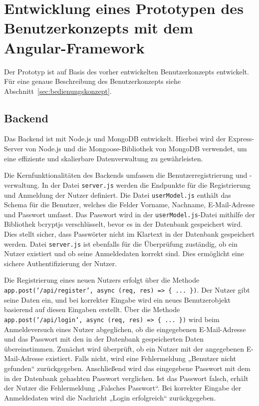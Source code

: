 \chapter{Entwicklung eines Prototypen des Benutzerkonzepts mit dem Angular-Framework}
\label{chap:prototyp}
Der Prototyp ist auf Basis des vorher entwickelten Benutzerkonzepts entwickelt. Für eine genaue Beschreibung des Benutzerkonzepts siehe Abschnitt~\ref{sec:bedienungskonzept}.

\section{Backend}
Das Backend ist mit Node.js und MongoDB entwickelt. 
Hierbei wird der Express-Server von Node.js und die Mongoose-Bibliothek von MongoDB verwendet, um eine effiziente und skalierbare Datenverwaltung zu gewährleisten.

Die Kernfunktionalitäten des Backends umfassen die Benutzerregistrierung und -verwaltung. 
In der Datei \texttt{server.js} werden die Endpunkte für die Registrierung und Anmeldung der Nutzer definiert. 
Die Datei \texttt{userModel.js} enthält das Schema für die Benutzer, welches die Felder Vorname, Nachname, E-Mail-Adresse und Passwort umfasst. 
Das Passwort wird in der \texttt{userModel.js}-Datei mithilfe der Bibliothek bcryptjs verschlüsselt, bevor es in der Datenbank gespeichert wird. 
Dies stellt sicher, dass Passwörter nicht im Klartext in der Datenbank gespeichert werden. 
 Datei \texttt{server.js} ist ebenfalls für die Überprüfung zuständig, ob ein Nutzer existiert und ob seine Anmeldedaten korrekt sind. 
 Dies ermöglicht eine sichere Authentifizierung der Nutzer.

Die Registrierung eines neuen Nutzers erfolgt über die Methode \texttt{app.post('/api/register', async (req, res) => \{ ... \})}. 
Der Nutzer gibt seine Daten ein, und bei korrekter Eingabe wird ein neues Benutzerobjekt basierend auf diesen Eingaben erstellt. 
Über die Methode \texttt{app.post('/api/login', async (req, res) => \{ ... \})} wird beim Anmeldeversuch eines Nutzer abgeglichen, ob die eingegebenen E-Mail-Adresse und das Passwort mit den in der Datenbank gespeicherten Daten übereinstimmen. 
Zunächst wird überprüft, ob ein Nutzer mit der angegebenen E-Mail-Adresse existiert. 
Falls nicht, wird eine Fehlermeldung „Benutzer nicht gefunden“ zurückgegeben. 
Anschließend wird das eingegebene Passwort mit dem in der Datenbank gehashten Passwort verglichen. 
Ist das Passwort falsch, erhält der Nutzer die Fehlermeldung „Falsches Passwort“. 
Bei korrekter Eingabe der Anmeldedaten wird die Nachricht „Login erfolgreich“ zurückgegeben.

